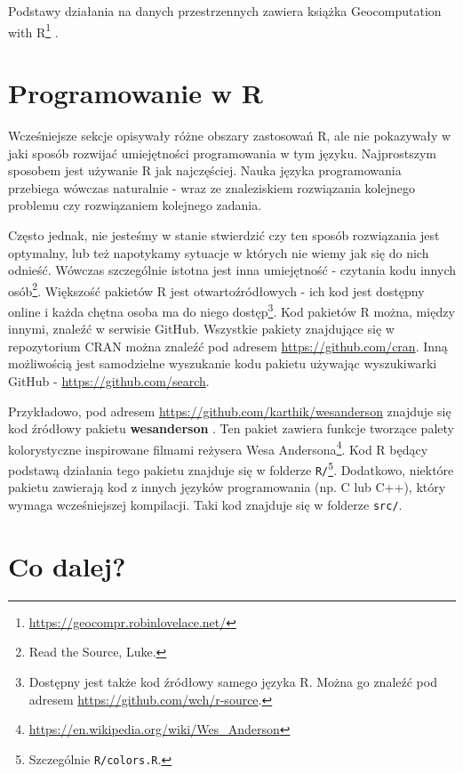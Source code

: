 \documentclass[paper=6in:9in,pagesize=pdftex,headinclude=on,footinclude=on,10pt]{scrbook}
\DeclareRobustCommand{\href}[2]{#2\footnote{\url{#1}}}
\begin{document}
Podstawy działania na danych przestrzennych zawiera książka \href{https://geocompr.robinlovelace.net/}{Geocomputation with R} \citep{lovelace2019geocomputation}.

\hypertarget{programowanie-w-r}{%
\section{Programowanie w R}\label{programowanie-w-r}}

Wcześniejsze sekcje opisywały różne obszary zastosowań R, ale nie pokazywały w jaki sposób rozwijać umiejętności programowania w tym języku.
Najprostszym sposobem jest używanie R jak najczęściej.
Nauka języka programowania przebiega wówczas naturalnie - wraz ze znaleziskiem rozwiązania kolejnego problemu czy rozwiązaniem kolejnego zadania.

Często jednak, nie jesteśmy w stanie stwierdzić czy ten sposób rozwiązania jest optymalny, lub też napotykamy sytuacje w których nie wiemy jak się do nich odnieść.
Wówczas szczególnie istotna jest inna umiejętność - czytania kodu innych osób\footnote{Read the Source, Luke.}.
Większość pakietów R jest otwartoźródłowych - ich kod jest dostępny online i każda chętna osoba ma do niego dostęp\footnote{Dostępny jest także kod źródłowy samego języka R.
  Można go znaleźć pod adresem \url{https://github.com/wch/r-source}.}.
Kod pakietów R można, między innymi, znaleźć w serwisie GitHub.
Wszystkie pakiety znajdujące się w repozytorium CRAN można znaleźć pod adresem \url{https://github.com/cran}.
Inną możliwością jest samodzielne wyszukanie kodu pakietu używając wyszukiwarki GitHub - \url{https://github.com/search}.

Przykładowo, pod adresem \url{https://github.com/karthik/wesanderson} znajduje się kod źródłowy pakietu \textbf{wesanderson} \citep{R-wesanderson}.
Ten pakiet zawiera funkcje tworzące palety kolorystyczne inspirowane filmami reżysera \href{https://en.wikipedia.org/wiki/Wes_Anderson}{Wesa Andersona}.
Kod R będący podstawą działania tego pakietu znajduje się w folderze \texttt{R/}\footnote{Szczególnie \texttt{R/colors.R}.}.
Dodatkowo, niektóre pakietu zawierają kod z innych języków programowania (np. C lub C++), który wymaga wcześniejszej kompilacji.
Taki kod znajduje się w folderze \texttt{src/}.

\hypertarget{co-dalej}{%
\section{Co dalej?}\label{co-dalej}}
\end{document}
